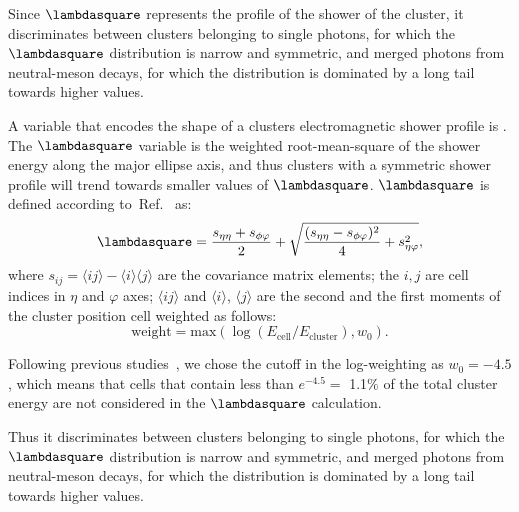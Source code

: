 Since $\lambdasquare$ represents the profile of the shower of the cluster, it discriminates between clusters belonging to single photons, for which the $\lambdasquare$ distribution is narrow and symmetric, and merged photons from neutral-meson decays, for which the distribution is dominated by a long tail towards higher values. 



A variable that encodes the shape of a clusters electromagnetic shower profile is \lambdasquare. The $\lambdasquare$ variable is the weighted root-mean-square of the shower energy along the major ellipse axis, and thus clusters with a symmetric shower profile will trend towards smaller values of $\lambdasquare$. $\lambdasquare$ is defined according to~Ref.~\cite{Abelev:2014ffa} as:
\begin{equation}
\lambdasquare = \frac{s_{\eta\eta}+ s_{\phi\varphi}}{2} + \sqrt{   \frac{(s_{\eta\eta} - s_{\phi\varphi})^{2}}{4} + s^{2}_{\eta\varphi}         },
\end{equation}
where $s_{ij} = \langle ij \rangle - \langle i \rangle\langle j \rangle$ are the covariance matrix elements; the $i,j$ are cell indices in $\eta$ and  $\varphi$ axes; $\langle ij \rangle$ and $\langle i\rangle$, $\langle j\rangle$ are the second and the first moments of the cluster position cell weighted as follows:
\begin{equation}
\mathrm{weight} = \mathrm{max}\left(\log(E_{\mathrm{cell}}/E_{\mathrm{cluster}}), w_{0}\right). 
\end{equation}

Following previous studies~\cite{Acharya:2018dqe}, we chose the cutoff in the log-weighting as $w_{0}=-4.5$, which means that cells that contain less than {$e^{-4.5} =$ 1.1$\%$} of the total cluster energy are not considered in the $\lambdasquare$ calculation.

Thus it discriminates between clusters belonging to single photons, for which the $\lambdasquare$ distribution is narrow and symmetric, and merged photons from neutral-meson decays, for which the distribution is dominated by a long tail towards higher values.

